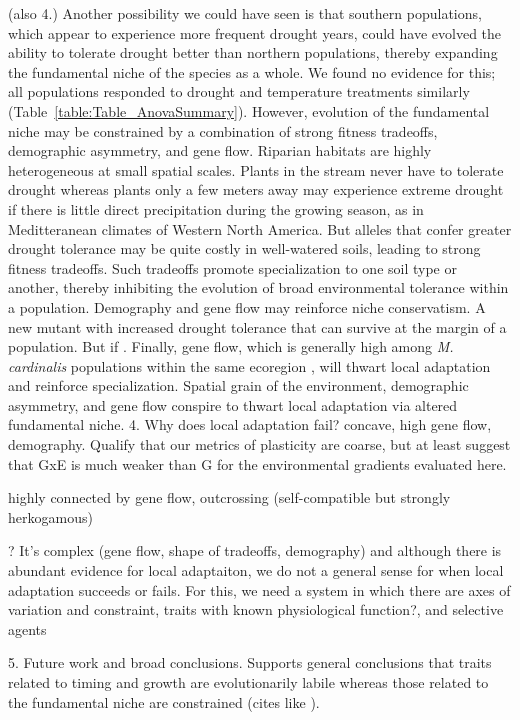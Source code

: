 \documentclass[11pt, oneside]{article}\usepackage[]{graphicx}\usepackage[]{color}
\begin{document}
(also 4.) Another possibility we could have seen is that southern populations, which appear to experience more frequent drought years, could have evolved the ability to tolerate drought better than northern populations, thereby expanding the fundamental niche of the species as a whole. We found no evidence for this; all populations responded to drought and temperature treatments similarly (Table~\ref{table:Table_AnovaSummary}). However, evolution of the fundamental niche may be constrained by a combination of strong fitness tradeoffs, demographic asymmetry, and gene flow. Riparian habitats are highly heterogeneous at small spatial scales. Plants in the stream never have to tolerate drought whereas plants only a few meters away may experience extreme drought if there is little direct precipitation during the growing season, as in Meditteranean climates of Western North America. But alleles that confer greater drought tolerance may be quite costly in well-watered soils, leading to strong fitness tradeoffs. Such tradeoffs promote specialization to one soil type or another, thereby inhibiting the evolution of broad environmental tolerance within a population. Demography and gene flow may reinforce niche conservatism. A new mutant with increased drought tolerance that can survive at the margin of a population. But if . Finally, gene flow, which is generally high among \textit{M. cardinalis} populations within the same ecoregion \citep{Paul_etal_2015}, will thwart local adaptation and reinforce specialization. Spatial grain of the environment, demographic asymmetry, and gene flow conspire to thwart local adaptation via altered fundamental niche.
4. Why does local adaptation fail? concave, high gene flow, demography. Qualify that our metrics of plasticity are coarse, but at least suggest that GxE is much weaker than G for the environmental gradients evaluated here.

highly connected by gene flow, outcrossing (self-compatible but strongly herkogamous)

? It's complex (gene flow, shape of tradeoffs, demography) and although there is abundant evidence for local adaptaiton, we do not a general sense for when local adaptation succeeds or fails. For this, we need a system in which there are axes of variation and constraint, traits with known physiological function?, and selective agents

5. Future work and broad conclusions. Supports general conclusions that traits related to timing and growth are evolutionarily labile whereas those related to the fundamental niche are constrained (cites like \cite{Emery_etal_2012, Emery_Ackerly_2014}).
\end{document}
